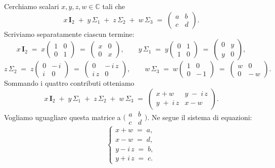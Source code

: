 \documentclass{article}
\theoremstyle{plain}
\theoremstyle{definition}
\theoremstyle{remark}
\begin{document}
Cerchiamo scalari \(x,y,z,w\in\mathbb{C}\) tali che
\[
x\,\mathbf{I}_2 \;+\; y\,\Sigma_1 \;+\; z\,\Sigma_2 \;+\; w\,\Sigma_3
\;=\;
\begin{pmatrix} a & b \\ c & d \end{pmatrix}.
\]
Scriviamo separatamente ciascun termine:
\[
x\,\mathbf{I}_2
\;=\;
x \begin{pmatrix}1 & 0 \\ 0 & 1\end{pmatrix}
\;=\;
\begin{pmatrix} x & 0 \\[4pt] 0 & x \end{pmatrix},
\qquad
y\,\Sigma_1
\;=\;
y \begin{pmatrix}0 & 1 \\ 1 & 0\end{pmatrix}
\;=\;
\begin{pmatrix} 0 & y \\[4pt] y & 0 \end{pmatrix},
\]
\[
z\,\Sigma_2
\;=\;
z \begin{pmatrix}0 & -\,i \\[4pt] i & 0\end{pmatrix}
\;=\;
\begin{pmatrix} 0 & -\,i\,z \\[4pt] i\,z & 0 \end{pmatrix},
\qquad
w\,\Sigma_3
\;=\;
w \begin{pmatrix}1 & 0 \\ 0 & -\,1\end{pmatrix}
\;=\;
\begin{pmatrix} w & 0 \\[4pt] 0 & -\,w \end{pmatrix}.
\]
Sommando i quattro contributi otteniamo
\[
x\,\mathbf{I}_2 \;+\; y\,\Sigma_1 \;+\; z\,\Sigma_2 \;+\; w\,\Sigma_3
\;=\;
\begin{pmatrix}
    x + w        & y \;-\; i\,z \\[6pt]
    y \;+\; i\,z & x - w
\end{pmatrix}.
\]
Vogliamo uguagliare questa matrice a \(\bigl(\begin{smallmatrix}a & b \\ c & d\end{smallmatrix}\bigr)\). Ne segue il sistema di equazioni:
\[
\begin{cases}
x + w \;=\; a,\\[4pt]
x - w \;=\; d,\\[6pt]
y - i\,z \;=\; b,\\[4pt]
y + i\,z \;=\; c.
\end{cases}
\]
\end{document}
